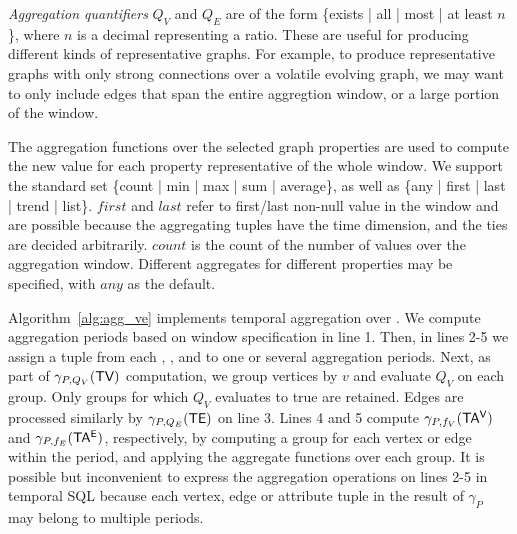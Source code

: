 {\em Aggregation quantifiers} $Q_V$ and $Q_E$ are of the form
\{exists | all | most | at least $n$ \}, where $n$ is a
decimal representing a ratio.  These are useful for producing
different kinds of representative graphs.  For example, to produce
representative graphs with only strong connections over a volatile
evolving graph, we may want to only include edges that span the entire
aggregtion window, or a large portion of the window.

The aggregation functions over the selected graph properties are used
to compute the new value for each property representative of the whole
window.  We support the standard set \{count | min | max | sum |
average\}, as well as \{any | first | last | trend | list\}.  $first$
and $last$ refer to first/last non-null value in the window and are
possible because the aggregating tuples have the time dimension, and
the ties are decided arbitrarily.  $count$ is the count of the number
of values over the aggregation window.  Different aggregates for
different properties may be specified, with $any$ as the default.

Algorithm~\ref{alg:agg_ve} implements temporal aggregation over \tve.
We compute aggregation periods based on window specification in line
1.  Then, in lines 2-5 we assign a tuple from each \tv, \te, \tav and
\tae to one or several aggregation periods.  Next, as part of
$\gamma_{P,Q_V}(\textsf{TV})$ computation, we group vertices by $v$ and
evaluate $Q_V$ on each group.  Only groups for which $Q_V$ evaluates
to true are retained.  Edges are processed similarly by
$\gamma_{P,Q_E}(\textsf{TE})$ on line 3.  Lines 4 and 5 compute
$\gamma_{P,f_V}(\mathsf{TA^{V}})$ and $\gamma_{P,f_E}(\mathsf{TA^{E}})$, respectively, by
computing a group for each vertex or edge within the period, and
applying the aggregate functions over each group.  It is possible but
inconvenient to express the aggregation operations on lines 2-5 in
temporal SQL because each vertex, edge or attribute tuple in the
result of $\gamma_{P}$ may belong to multiple periods.

